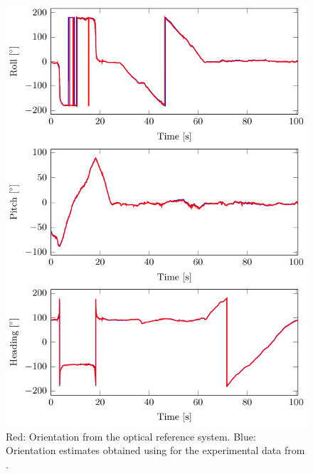 \begin{figure}
	\centering
	\includegraphics[scale = 1]{figure4_12.pdf}
    	\caption{Red: Orientation from the optical reference system. Blue: Orientation estimates obtained using  for the experimental data from .}
	\label{fig:oriEst-oriExpResults}
\end{figure}


